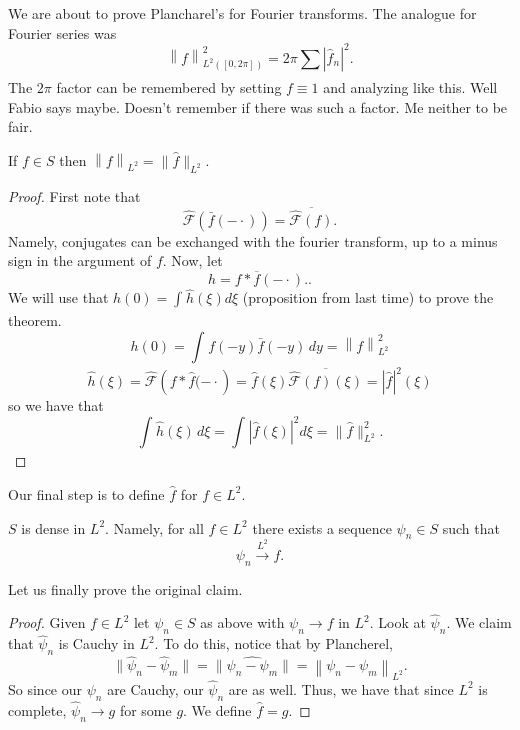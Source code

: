 \begin{remark}
	We are about to prove Plancharel's for Fourier transforms. The analogue for Fourier series was
	\[ \left\lVert f \right\rVert^{2}_{L^{2}([0, 2 \pi])} = 2 \pi \sum_{} |\hat f_{n}|^{2}. \]
	The \( 2 \pi \) factor can be remembered by setting \( f \equiv 1 \) and analyzing like this. Well Fabio says maybe. Doesn't remember if there was such a factor. Me neither to be fair.
\end{remark}

\begin{theorem}[Plancherel]
	If \( f \in S \) then \( \left\lVert f \right\rVert_{L^{2}} = \lVert \hat f \rVert_{L^{2}} \).
\end{theorem}
\begin{proof}
	First note that
	\[ \hat {\mathcal{F}}(\bar f(- \cdot)) = \overline{\hat {\mathcal{F}}(f)}. \]
	Namely, conjugates can be exchanged with the fourier transform, up to a minus sign in the argument of \( f \). Now, let
	\[ h = f * \overline{f}(- \cdot).. \]
	We will use that \( h(0) = \int_{} \hat h(\xi) d \xi \) (proposition from last time) to prove the theorem.
	\[
		h(0) = \int_{} f(-y) \bar f(-y) \, dy
		= \left\lVert f \right\rVert_{L^{2}}^{2}
	\]
	\[ \hat h(\xi) = \hat {\mathcal{F}} \left( f * \hat f(- \cdot \right) = \hat f(\xi) \overline{\hat {\mathcal{F}}(f)(\xi)} = | \hat f |^{2}(\xi) \]
	so we have that
	\[ \int_{} \hat h(\xi) \, d \xi = \int_{} |\hat f(\xi)|^{2} d \xi = \| \hat f \|^{2}_{L^{2}}. \]
\end{proof}

Our final step is to define \( \hat f \) for \( f \in L^{2} \).
\begin{lemma}
	\( S \) is dense in \( L^{2} \). Namely, for all \( f \in L^{2} \) there exists a sequence \( \psi_{n} \in S \) such that
	\[ \psi_{n} \xrightarrow{L^{2}} f. \]
\end{lemma}
Let us finally prove the original claim.
\begin{proof}
	Given \( f \in L^{2} \) let \( \psi_{n} \in S \) as above with \( \psi_{n} \to f \) in \( L^{2} \). Look at \( \hat \psi_{n} \). We claim that \( \hat \psi_{n} \) is Cauchy in \( L^{2} \). To do this, notice that by Plancherel,
	\[ \|\hat \psi_{n} - \hat \psi_{m}\| = \|\widehat{\psi_{n} - \psi_{m}}\| = \left\lVert \psi_{n} - \psi_{m} \right\rVert_{L^{2}}. \]
	So since our \( \psi_{n} \) are Cauchy, our \( \hat \psi_{n} \) are as well. Thus, we have that since \( L^{2} \) is complete, \( \hat \psi_{n} \to g \) for some \( g \). We define \( \hat f = g \).
\end{proof}

